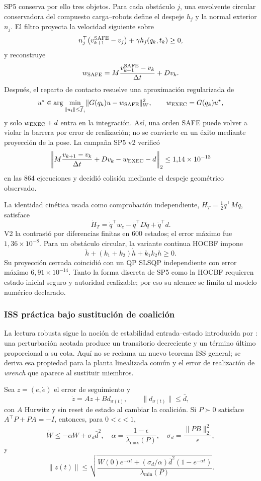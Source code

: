 SP5 conserva por ello tres objetos. Para cada obstáculo $j$, una envolvente
circular conservadora del compuesto carga--robots define el despeje $h_j$ y la
normal exterior $n_j$. El filtro proyecta la velocidad siguiente sobre
\[
 n_j^\top\!\left(v_{k+1}^{\rm SAFE}-v_j\right)+\gamma h_j(q_k,t_k)\geq0,
\]
y reconstruye
\[
 w_{\rm SAFE}=M\frac{v_{k+1}^{\rm SAFE}-v_k}{\Delta t}+Dv_k.
\]
Después, el reparto de contacto resuelve una aproximación regularizada de
\[
 u^\star\in\arg\min_{\lVert u_i\rVert\leq\bar f_i}
       \lVert G(q_k)u-w_{\rm SAFE}\rVert_W^2,
 \qquad w_{\rm EXEC}=G(q_k)u^\star,
\]
y solo $w_{\rm EXEC}+d$ entra en la integración. Así, una orden SAFE puede
volver a violar la barrera por error de realización; no se convierte en un
éxito mediante proyección de la pose. La campaña SP5 v2 verificó
\[
 \left\|M\frac{v_{k+1}-v_k}{\Delta t}+Dv_k-w_{\rm EXEC}-d\right\|_2
 \leq 1{,}14\times10^{-13}
\]
en las 864 ejecuciones y decidió colisión mediante el despeje geométrico
observado.

La identidad cinética usada como comprobación independiente,
$H_T=\tfrac12\dot q^\top M\dot q$, satisface
\[
 \dot H_T=\dot q^\top w_c-\dot q^\top D\dot q+\dot q^\top d.
\]
V2 la contrastó por diferencias finitas en 600 estados; el error máximo fue
$1{,}36\times10^{-8}$. Para un obstáculo circular, la variante continua HOCBF
impone
\[
 \ddot h+(k_1+k_2)\dot h+k_1k_2h\geq0.
\]
Su proyección cerrada coincidió con un QP SLSQP independiente con error máximo
$6{,}91\times10^{-14}$. Tanto la forma discreta de SP5 como la HOCBF requieren
estado inicial seguro y autoridad realizable; por eso su alcance se limita al modelo numérico declarado.

\subsubsection{ISS práctica bajo sustitución de coalición}

La lectura robusta sigue la noción de estabilidad entrada--estado introducida por
\citet{sontag1989smooth}: una perturbación acotada produce un transitorio decreciente y
un término último proporcional a su cota. Aquí no se reclama un nuevo teorema ISS
general; se deriva esa propiedad para la planta linealizada común y el error de
realización de \emph{wrench} que aparece al sustituir miembros.

\begin{teorema}
\label{thm:iss-practica-coalicion}
Sea $z=(e,\dot e)$ el error de seguimiento y
\[
 \dot z=Az+B d_{\sigma(t)},
 \qquad \lVert d_{\sigma(t)}\rVert\leq\bar d,
\]
con $A$ Hurwitz y sin reset de estado al cambiar la coalición. Si $P\succ0$ satisface $A^\top P+PA=-I$, entonces, para $0<\epsilon<1$,
\[
 \dot W\leq-\alpha W+\sigma_d\bar d^2,
 \quad
 \alpha=\frac{1-\epsilon}{\lambda_{\max}(P)},
 \quad
 \sigma_d=\frac{\lVert PB\rVert_2^2}{\epsilon},
\]
y
\[
 \lVert z(t)\rVert\leq
 \sqrt{\frac{W(0)e^{-\alpha t}+(\sigma_d/\alpha)\bar d^2(1-e^{-\alpha t})}{\lambda_{\min}(P)}}.
\]
\end{teorema}

